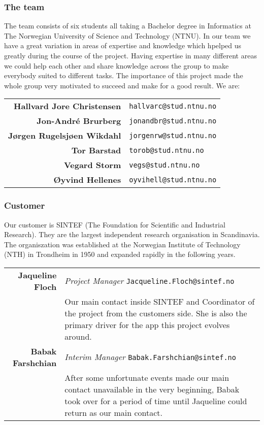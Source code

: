 \subsubsection{The team}
The team consists of six students all taking a Bachelor degree in Informatics at The Norwegian University of Science and Technology (NTNU). In our team we have a great variation in areas of expertise and knowledge which hpelped us greatly during the course of the project. Having expertise in many different areas we could help each other and share knowledge across the group to make everybody suited to different tasks. The importance of this project made the whole group very motivated to succeed and make for a good result.
We are:\\

\begin{tabular}{r|p{11cm}}
\textbf{Hallvard Jore Christensen} & \texttt{hallvarc@stud.ntnu.no}\\[6pt]
\textbf{Jon-André Brurberg} & \texttt{jonandbr@stud.ntnu.no}\\[6pt]
\textbf{Jørgen Rugelsjøen Wikdahl} & \texttt{jorgenrw@stud.ntnu.no}\\[6pt]
\textbf{Tor Barstad} & \texttt{torob@stud.ntnu.no}\\[6pt]
\textbf{Vegard Storm} & \texttt{vegs@stud.ntnu.no}\\[6pt]
\textbf{Øyvind Hellenes} & \texttt{oyvihell@stud.ntnu.no}\\
\end{tabular}

\subsubsection{Customer}
Our customer is SINTEF (The Foundation for Scientific and Industrial Research). They are the largest independent research organisation in Scandinavia. The organiszation was established at the Norwegian Institute of Technology (NTH) in Trondheim in 1950 and expanded rapidly in the following years.

\begin{tabular}{r|p{11cm}}
\textbf{Jaqueline Floch} & \emph{Project Manager}   \texttt{Jacqueline.Floch@sintef.no}\\[4pt]
& Our main contact inside SINTEF and Coordinator of the project from the customers side. She is also the primary driver for the app this project evolves around. \\[8pt]
\textbf{Babak Farshchian} & \emph{Interim Manager}   \texttt{Babak.Farshchian@sintef.no}\\[4pt]
& After some unfortunate events made our main contact unavailable in the very beginning, Babak took over for a period of time until Jaqueline could return as our main contact. \\
\end{tabular}


